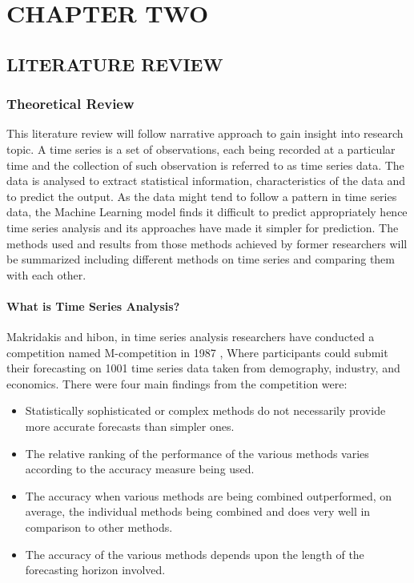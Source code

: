 \documentclass[
  letterpaper,
  DIV=11,
  numbers=noendperiod]{scrartcl}
\let\oldparagraph\paragraph
\renewcommand{\paragraph}[1]{\oldparagraph{#1}\mbox{}}
\begin{document}
\hypertarget{chapter-two}{%
\section{CHAPTER TWO}\label{chapter-two}}

\hypertarget{literature-review}{%
\subsection{LITERATURE REVIEW}\label{literature-review}}

\hypertarget{theoretical-review}{%
\subsubsection{Theoretical Review}\label{theoretical-review}}

This literature review will follow narrative approach to gain insight
into research topic. A time series is a set of observations, each being
recorded at a particular time and the collection of such observation is
referred to as time series data. The data is analysed to extract
statistical information, characteristics of the data and to predict the
output. As the data might tend to follow a pattern in time series data,
the Machine Learning model finds it difficult to predict appropriately
hence time series analysis and its approaches have made it simpler for
prediction. The methods used and results from those methods achieved by
former researchers will be summarized including different methods on
time series and comparing them with each other.

\hypertarget{what-is-time-series-analysis}{%
\paragraph{What is Time Series
Analysis?}\label{what-is-time-series-analysis}}

Makridakis and hibon, in time series analysis researchers have conducted
a competition named M-competition in 1987 , Where participants could
submit their forecasting on 1001 time series data taken from demography,
industry, and economics. There were four main findings from the
competition were:

\begin{itemize}
\item
  Statistically sophisticated or complex methods do not necessarily
  provide more accurate forecasts than simpler ones.
\item
  The relative ranking of the performance of the various methods varies
  according to the accuracy measure being used.
\item
  The accuracy when various methods are being combined outperformed, on
  average, the individual methods being combined and does very well in
  comparison to other methods.
\item
  The accuracy of the various methods depends upon the length of the
  forecasting horizon involved.
\end{itemize}
\end{document}
